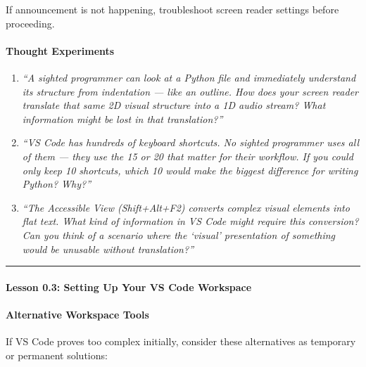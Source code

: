 \documentclass[
  justified,
  openright,
]{tufte-book}
\let\subsubsection\paragraph
\let\paragraph\paragraph
\let\subsubsection\paragraph
\let\paragraph\paragraph
\begin{document}
If announcement is not happening, troubleshoot screen reader settings
before proceeding.

\paragraph{Thought Experiments}\label{thought-experiments-1}

\begin{enumerate}
\def\labelenumi{\arabic{enumi}.}
\item
  \emph{``A sighted programmer can look at a Python file and immediately
  understand its structure from indentation --- like an outline. How
  does your screen reader translate that same 2D visual structure into a
  1D audio stream? What information might be lost in that
  translation?''}
\item
  \emph{``VS Code has hundreds of keyboard shortcuts. No sighted
  programmer uses all of them --- they use the 15 or 20 that matter for
  their workflow. If you could only keep 10 shortcuts, which 10 would
  make the biggest difference for writing Python? Why?''}
\item
  \emph{``The Accessible View (Shift+Alt+F2) converts complex visual
  elements into flat text. What kind of information in VS Code might
  require this conversion? Can you think of a scenario where the
  `visual' presentation of something would be unusable without
  translation?''}
\end{enumerate}

\begin{center}\rule{0.5\linewidth}{0.5pt}\end{center}

\subsubsection{Lesson 0.3: Setting Up Your VS Code
Workspace}\label{lesson-0.3-setting-up-your-vs-code-workspace}

\paragraph{Alternative Workspace
Tools}\label{alternative-workspace-tools}

If VS Code proves too complex initially, consider these alternatives as
temporary or permanent solutions:
\end{document}
